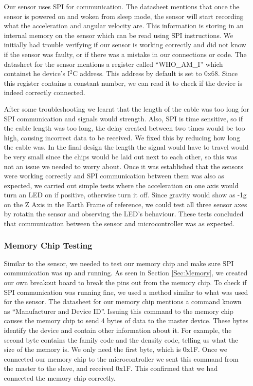 Our sensor uses SPI for communication.
The datasheet mentions that once the sensor is powered on and woken from sleep mode,
the sensor will start recording what the acceleration and angular velocity are.
This information is storing in an internal memory on the sensor which can be read using SPI instructions.
We initially had trouble verifying if our sensor is working correctly and did not know if the sensor was faulty,
or if there was a mistake in our connections or code.
The datasheet for the sensor mentions a register called ``WHO\_AM\_I'' which containst he device's I$^2$C address.
This address by default is set to 0x68.
Since this register contains a constant number, we can read it to check if the device is indeed correctly connected.

After some troubleshooting we learnt that the length of the cable was too long for SPI communication and signals would strength.
Also, SPI is time sensitive, so if the cable length was too long,
the delay created between two times would be too high,
causing incorrect data to be received.
We fixed this by reducing how long the cable was.
In the final design the length the signal would have to travel would be very small since the chips would be laid out next to each other,
so this was not an issue we needed to worry about.
Once it was established that the sensors were working correctly and SPI communication between them was also as expected,
we carried out simple tests where the acceleration on one axis would turn an LED on if positive,
otherwise turn it off.
Since gravity would show as -1g on the Z Axis in the Earth Frame of reference,
we could test all three sensor axes by rotatin the sensor and observing the LED's behaviour.
These tests concluded that communication between the sensor and microcontroller was as expected.

\subsubsection{Memory Chip Testing}
\label{Sec:MemoryTesting}
Similar to the sensor, we needed to test our memory chip and make sure SPI communication was up and running.
As seen in Section \ref{Sec:Memory},
we created our own breakout board to break the pins out from the memory chip.
To check if SPI communication was running fine,
we used a method similar to what was used for the sensor.
The datasheet for our memory chip mentions a command known as ``Manufacturer and Device ID''.
Issuing this command to the memory chip causes the memory chip to send 4 bytes of data to the master device.
These bytes identify the device and contain other information about it. 
For example, the second byte contains the family code and the density code,
telling us what the size of the memory is.
We only need the first byte, which is 0x1F.
Once we connected our memory chip to the microcontroller we sent this command from the master to the slave,
and received 0x1F.
This confirmed that we had connected the memory chip correctly.

